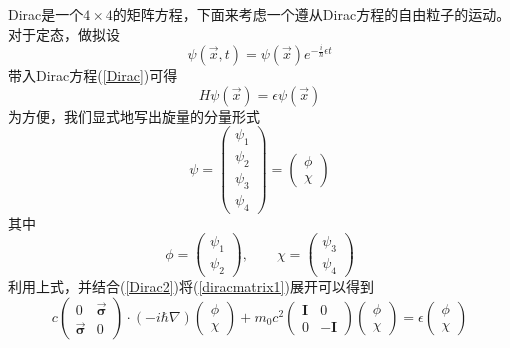 Dirac是一个$4\times 4$的矩阵方程，下面来考虑一个遵从Dirac方程的自由粒子的运动。
对于定态，做拟设
\begin{equation}
    \psi(\vec{x},t)=\psi(\vec{x})e^{-\frac{i}{\hbar}\epsilon t}
\end{equation}
带入Dirac方程(\ref{Dirac})可得
\begin{equation}
\label{Dirac2}
    H\psi(\vec{x})=\epsilon \psi(\vec{x})
\end{equation}
为方便，我们显式地写出旋量的分量形式
\begin{equation}
    \psi=
    \left(                 
  \begin{array}{c}   
    \psi_{1} \\  
    \psi_{2} \\  
    \psi_{3} \\
    \psi_{4}
  \end{array}
\right)
=
\left(                 
  \begin{array}{c}   
    \phi \\  
    \chi 
  \end{array}
\right)
\end{equation}
其中
\begin{equation*}
    \phi=\left(                 
  \begin{array}{c}   
    \psi_{1} \\  
    \psi_{2}
  \end{array}
\right),\qquad
\chi=\left(                 
  \begin{array}{c}   
    \psi_{3} \\  
    \psi_{4}
  \end{array}
\right)
\end{equation*}
利用上式，并结合(\ref{Dirac2})将(\ref{diracmatrix1})展开可以得到
\begin{equation}
    c
    \left(                 
  \begin{array}{cc}   
    0 & \vec{\pmb{\sigma}} \\  
    \vec{\pmb{\sigma}} & 0
  \end{array}
  \right)
  \cdot
  (-i\hbar \nabla)
  \left(                 
  \begin{array}{c}   
    \phi \\  
    \chi 
  \end{array}
\right)
+
m_{0}c^{2}
\left(                 
  \begin{array}{cc}   
    \pmb{I} & 0 \\  
    0 &  -\pmb{I}
  \end{array}
\right)
\left(
\begin{array}{c}   
    \phi \\  
    \chi 
  \end{array}
\right)
=\epsilon
\left(
\begin{array}{c}   
    \phi \\  
    \chi 
  \end{array}
\right)
\end{equation}

